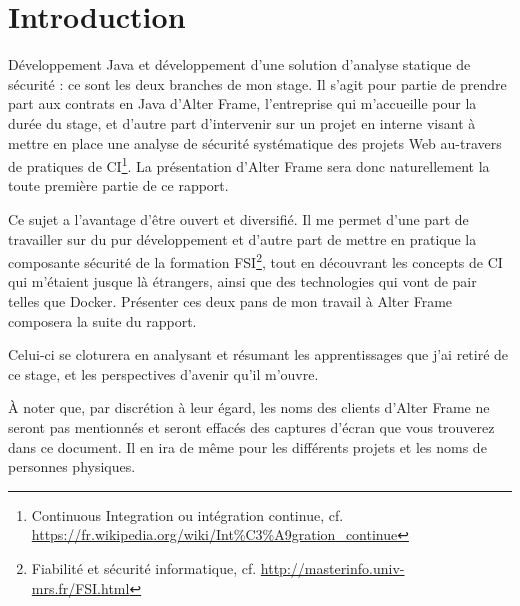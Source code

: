 \section*{Introduction}
Développement Java et développement d'une solution d'analyse statique de sécurité : ce sont les deux branches de mon stage. Il s'agit pour partie de prendre part aux contrats en Java d'Alter Frame, l'entreprise qui m'accueille pour la durée du stage, et d'autre part d'intervenir sur un projet en interne visant à mettre en place une analyse de sécurité systématique des projets Web au-travers de pratiques de CI\footnote{Continuous Integration ou intégration continue, cf. \url{https://fr.wikipedia.org/wiki/Int\%C3\%A9gration_continue}}. La présentation d'Alter Frame sera donc naturellement la toute première partie de ce rapport.

Ce sujet a l'avantage d'être ouvert et diversifié. Il me permet d'une part de travailler sur du pur développement et d'autre part de mettre en pratique la composante sécurité de la formation FSI\footnote{Fiabilité et sécurité informatique, cf. \url{http://masterinfo.univ-mrs.fr/FSI.html}}, tout en découvrant les concepts de CI qui m'étaient jusque là étrangers, ainsi que des technologies qui vont de pair telles que Docker. Présenter ces deux pans de mon travail à Alter Frame composera la suite du rapport.

Celui-ci se cloturera en analysant et résumant les apprentissages que j'ai retiré de ce stage, et les perspectives d'avenir qu'il m'ouvre.

À noter que, par discrétion à leur égard, les noms des clients d'Alter Frame ne seront pas mentionnés et seront effacés des captures d'écran que vous trouverez dans ce document. Il en ira de même pour les différents projets et les noms de personnes physiques.